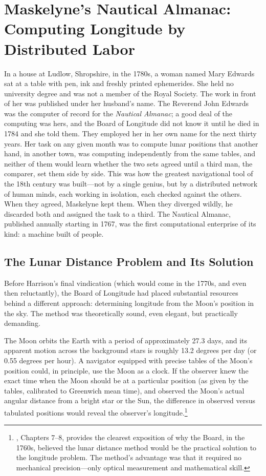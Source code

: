 \chapter{Maskelyne's Nautical Almanac: Computing Longitude by Distributed Labor}
\label{ch:maskelyne-nautical-almanac}

In a house at Ludlow, Shropshire, in the 1780s, a woman named Mary Edwards sat at a table with pen, ink and freshly printed ephemerides. She held no university degree and was not a member of the Royal Society. The work in front of her was published under her husband's name. The Reverend John Edwards was the computer of record for the \emph{Nautical Almanac}; a good deal of the computing was hers, and the Board of Longitude did not know it until he died in 1784 and she told them. They employed her in her own name for the next thirty years. Her task on any given month was to compute lunar positions that another hand, in another town, was computing independently from the same tables, and neither of them would learn whether the two sets agreed until a third man, the comparer, set them side by side. This was how the greatest navigational tool of the 18th century was built—not by a single genius, but by a distributed network of human minds, each working in isolation, each checked against the others. When they agreed, Maskelyne kept them. When they diverged wildly, he discarded both and assigned the task to a third. The Nautical Almanac, published annually starting in 1767, was the first computational enterprise of its kind: a machine built of people.

\section{The Lunar Distance Problem and Its Solution}

Before Harrison's final vindication (which would come in the 1770s, and even then reluctantly), the Board of Longitude had placed substantial resources behind a different approach: determining longitude from the Moon's position in the sky. The method was theoretically sound, even elegant, but practically demanding.

The Moon orbits the Earth with a period of approximately 27.3 days, and its apparent motion across the background stars is roughly 13.2 degrees per day (or 0.55 degrees per hour). A navigator equipped with precise tables of the Moon's position could, in principle, use the Moon as a clock. If the observer knew the exact time when the Moon should be at a particular position (as given by the tables, calibrated to Greenwich mean time), and observed the Moon's actual angular distance from a bright star or the Sun, the difference in observed versus tabulated positions would reveal the observer's longitude.\footnote{\textcite{Howse1980}, Chapters 7--8, provides the clearest exposition of why the Board, in the 1760s, believed the lunar distance method would be the practical solution to the longitude problem. The method's advantage was that it required no mechanical precision—only optical measurement and mathematical skill.}

